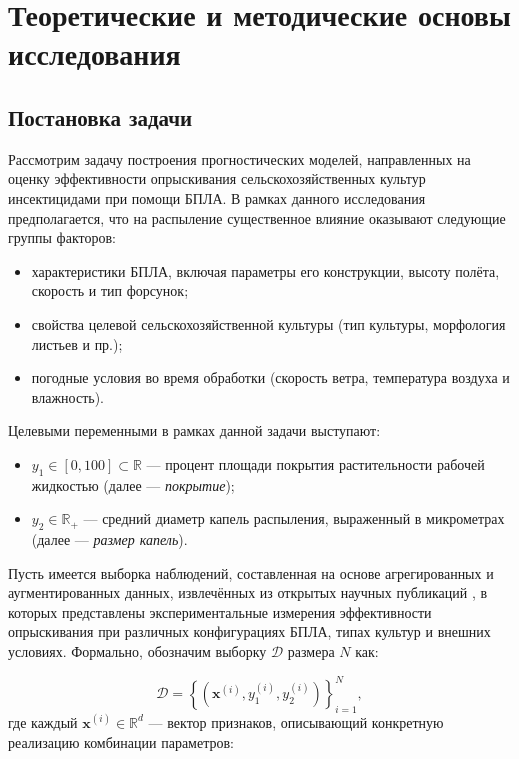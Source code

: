 \chapter{Теоретические и методические основы исследования} \label{ch1}

\section{Постановка задачи} \label{ch1:task}
Рассмотрим задачу построения прогностических моделей, направленных на оценку эффективности опрыскивания сельскохозяйственных культур инсектицидами при помощи БПЛА. В рамках данного исследования предполагается, что на распыление существенное влияние оказывают следующие группы факторов: 
\begin{itemize}
\item характеристики БПЛА, включая параметры его конструкции, высоту полёта, скорость и тип форсунок; 
\item свойства целевой сельскохозяйственной культуры (тип культуры, морфология листьев и пр.); 
\item погодные условия во время обработки (скорость ветра, температура воздуха и влажность).
\end{itemize}

Целевыми переменными в рамках данной задачи выступают:
\begin{itemize}
\item $y_1 \in [0, 100] \subset \mathbb{R}$ --- процент площади покрытия растительности рабочей жидкостью (далее --- \textit{покрытие});
\item $y_2 \in \mathbb{R}_{+}$ --- средний диаметр капель распыления, выраженный в микрометрах (далее --- \textit{размер капель}).
\end{itemize}

Пусть имеется выборка наблюдений, составленная на основе агрегированных и аугментированных данных, извлечённых из открытых научных публикаций \cite{Liu2025, Wu2025}, в которых представлены экспериментальные измерения эффективности опрыскивания при различных конфигурациях БПЛА, типах культур и внешних условиях. Формально, обозначим выборку $\mathcal{D}$ размера $N$ как:

\begin{equation}
	\mathcal{D} = \left\{ \left(\mathbf{x}^{(i)}, y_1^{(i)}, y_2^{(i)}\right) \right\}_{i=1}^{N},
\end{equation}
где каждый $\mathbf{x}^{(i)} \in \mathbb{R}^d$ --- вектор признаков, описывающий конкретную реализацию комбинации параметров:

